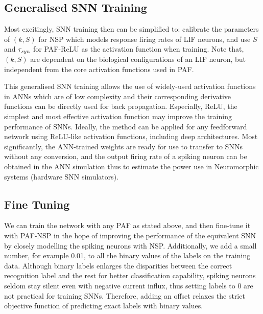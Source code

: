\documentclass{article}
\begin{document}
	\subsection{Generalised SNN Training}
	\label{subsec:ns_train}
	Most excitingly, SNN training then can be simplified to: calibrate the parameters of $(k, S)$ for NSP which models response firing rates of LIF neurons, and use $S$ and $\tau_{\textit{\textrm{syn}}}$ for PAF-ReLU as the activation function when training.
	Note that, $(k, S)$ are dependent on the biological configurations of an LIF neuron, but independent from the core activation functions used in PAF.
	
	This generalised SNN training allows the use of widely-used activation functions in ANNs which are of low complexity and their corresponding derivative functions can be directly used for back propagation.
	Especially, ReLU, the simplest and most effective activation function may improve the training performance of SNNs.
	Ideally, the method can be applied for any feedforward network using ReLU-like activation functions, including deep architectures.
	Most significantly, the ANN-trained weights are ready for use to transfer to SNNs without any conversion, and the output firing rate of a spiking neuron can be obtained in the ANN simulation thus to estimate the power use in Neuromorphic systems (hardware SNN simulators).
	
	
	
	\subsection{Fine Tuning}
	We can train the network with any PAF as stated above, and then fine-tune it with PAF-NSP in the hope of improving the performance of the equivalent SNN by closely modelling the spiking neurons with NSP.
	Additionally, we add a small number, for example 0.01, to all the binary values of the labels on the training data.
	Although binary labels enlarges the disparities between the correct recognition label and the rest for better classification capability, 
	spiking neurons seldom stay silent even with negative current influx, thus setting labels to 0 are not practical for training SNNs.
	Therefore, adding an offset relaxes the strict objective function of predicting exact labels with binary values.
\end{document}
